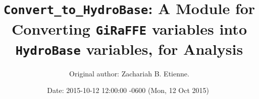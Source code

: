 \documentclass{article}
\begin{document}
\title{{\tt Convert\_to\_HydroBase}: A Module for Converting {\tt GiRaFFE} variables into {\tt HydroBase} variables, for Analysis}

\author{Original author: Zachariah B. Etienne. }

\date{$ $Date: 2015-10-12 12:00:00 -0600 (Mon, 12 Oct 2015) $ $}
\maketitle

%
%  
%                                                    
\end{document}
